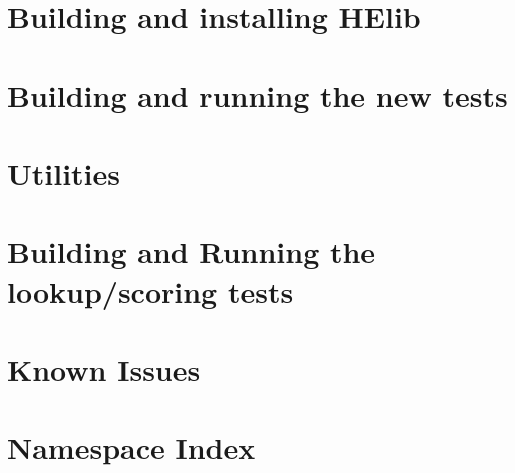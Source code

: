 \let\mypdfximage\pdfximage\def\pdfximage{\immediate\mypdfximage}\documentclass[twoside]{book}
\newcommand{\+}{\discretionary{\mbox{\scriptsize$\hookleftarrow$}}{}{}}
\begin{document}
\chapter{Building and installing H\+Elib}
\label{md___users__projects__f_h_e__h_elib__repos__public_staging_homenc__h_elib__i_n_s_t_a_l_l}

\chapter{Building and running the new tests}
\label{md___users__projects__f_h_e__h_elib__repos__public_staging_homenc__h_elib__t_e_s_t_s}

\chapter{Utilities}
\label{md___users__projects__f_h_e__h_elib__repos__public_staging_homenc__h_elib_utils__r_e_a_d_m_e}

\chapter{Building and Running the lookup/scoring tests}
\label{md___users__projects__f_h_e__h_elib__repos__public_staging_homenc__h_elib_misc_psi__r_e_a_d_m_e}

\chapter{Known Issues}
\label{md___users__projects__f_h_e__h_elib__repos__public_staging_homenc__h_elib__i_s_s_u_e_s}

\chapter{Namespace Index}

\end{document}
